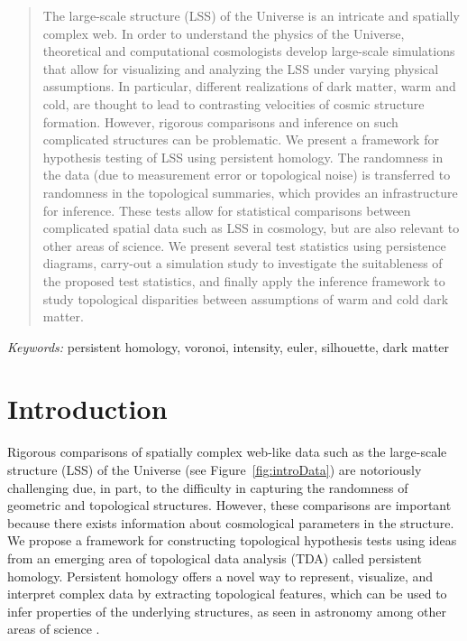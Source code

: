 \documentclass[12pt]{article}
\newcommand{\figref}[1]{Figure~\ref{#1}}
\begin{document}
\bigskip
\begin{abstract}
The large-scale structure (LSS) of the Universe is an intricate and spatially complex web. In order to understand the physics of the Universe, theoretical and computational cosmologists develop large-scale simulations that allow for visualizing and analyzing the LSS under varying physical assumptions. In particular, different realizations of dark matter, warm and cold, are thought to lead to contrasting velocities of cosmic structure formation. However, rigorous comparisons and inference on such complicated structures can be problematic.  We present a framework for hypothesis testing of LSS using persistent homology. The randomness in the data (due to measurement error or topological noise) is transferred to randomness in the topological summaries, which provides an infrastructure for inference. These tests allow for statistical comparisons between complicated spatial data such as LSS in cosmology, but are also relevant to other areas of science. We present several test statistics using persistence diagrams, carry-out a simulation study to investigate the suitableness of the proposed test statistics, and finally apply the inference framework to study topological disparities between assumptions of warm and cold dark matter.
\end{abstract}

\noindent%
{\it Keywords:} persistent homology, voronoi, intensity, euler, silhouette, dark matter



\section{Introduction}
\label{sec:intro}

Rigorous comparisons of spatially complex web-like data such as the large-scale structure (LSS) of the Universe (see \figref{fig:introData}) are notoriously challenging due, in part, to the difficulty in capturing the randomness of geometric and topological structures.  However, these comparisons are important because there exists information about cosmological parameters in the structure. We propose a framework for constructing topological hypothesis tests using ideas from an emerging area of topological data analysis (TDA) called persistent homology. Persistent homology offers a novel way to represent, visualize, and interpret complex data by extracting topological features, which can be used to infer properties of the underlying structures, as seen in astronomy \citep{Sousbie2011, SousbieEtAl2011, van2011alpha,cisewski2014non} among other areas of science \citep{bendich2014persistent, duong2012closed}.
\end{document}
